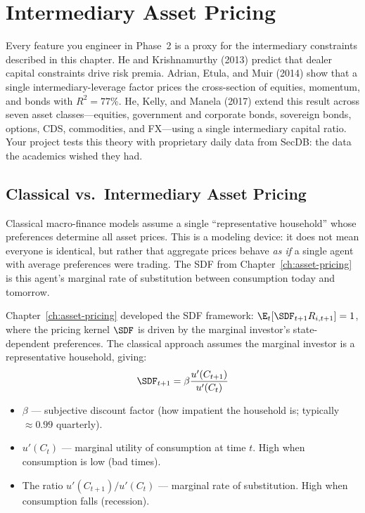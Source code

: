 \chapter{Intermediary Asset Pricing}
\label{ch:intermediary}

\begin{projectconnection}
Every feature you engineer in Phase~2 is a proxy for the intermediary constraints described in this chapter. He and Krishnamurthy (2013) predict that dealer capital constraints drive risk premia. Adrian, Etula, and Muir (2014) show that a single intermediary-leverage factor prices the cross-section of equities, momentum, and bonds with $R^2 = 77\%$. He, Kelly, and Manela (2017) extend this result across seven asset classes---equities, government and corporate bonds, sovereign bonds, options, CDS, commodities, and FX---using a single intermediary capital ratio. Your project tests this theory with proprietary daily data from SecDB: the data the academics wished they had.
\end{projectconnection}

\section{Classical vs.\ Intermediary Asset Pricing}
\label{sec:classical-vs-intermediary}

\begin{prereq}
Classical macro-finance models assume a single ``representative household'' whose preferences determine all asset prices. This is a modeling device: it does not mean everyone is identical, but rather that aggregate prices behave \emph{as if} a single agent with average preferences were trading. The SDF from Chapter~\ref{ch:asset-pricing} is this agent's marginal rate of substitution between consumption today and tomorrow.
\end{prereq}

Chapter~\ref{ch:asset-pricing} developed the SDF framework: $\E_t[\SDF_{t+1} R_{i,t+1}] = 1$, where the pricing kernel $\SDF$ is driven by the marginal investor's state-dependent preferences. The classical approach assumes the marginal investor is a representative household, giving:
\begin{equation}
\SDF_{t+1} = \beta \frac{u'(C_{t+1})}{u'(C_t)}
\label{eq:consumption-sdf}
\end{equation}
\begin{itemize}[nosep]
  \item $\beta$ --- subjective discount factor (how impatient the household is; typically ${\approx}0.99$ quarterly).
  \item $u'(C_t)$ --- marginal utility of consumption at time $t$. High when consumption is low (bad times).
  \item The ratio $u'(C_{t+1})/u'(C_t)$ --- marginal rate of substitution. High when consumption falls (recession).
\end{itemize}

